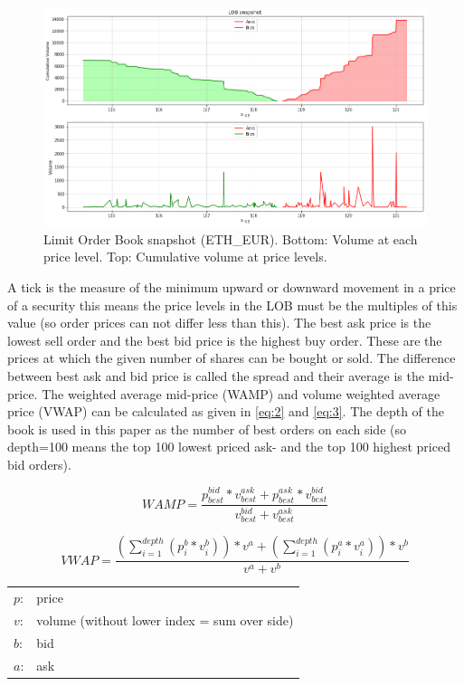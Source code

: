 \documentclass[11pt,a4paper,oneside]{article}
\begin{document}
  \begin{figure}[tbh]
    \centering
    \includegraphics[width=\textwidth]{lob_snapshot.png}
    \caption{Limit Order Book snapshot (ETH\_EUR). Bottom: Volume at each price level. Top: Cumulative volume at price levels.}
    \label{fig:1}
  \end{figure}

  A tick is the measure of the minimum upward or downward movement in a price of a security this means the price levels 
  in the LOB must be the multiples of this value (so order prices can not differ less than this). The best ask price is 
  the lowest sell order and the best bid price is the highest buy order. These are the prices at which the given number 
  of shares can be bought or sold. The difference between best ask and bid price is called the spread and their average 
  is the mid-price. The weighted average mid-price (WAMP) and volume weighted average price (VWAP) can be calculated as 
  given in \autoref{eq:2} and \autoref{eq:3}. The depth of the book is used in this paper as the number of best orders 
  on each side (so depth=100 means the top 100 lowest priced ask- and the top 100 highest priced bid orders).

  \begin{equation}
    WAMP = \frac{p_{best}^{bid} * v_{best}^{ask} + p_{best}^{ask} * v_{best}^{bid}}{v_{best}^{bid} + v_{best}^{ask}}
    \label{eq:2}
  \end{equation}

  \begin{equation}
    VWAP = \frac{(\sum_{i=1}^{depth} (p_i^b * v_i^b))*v^a + (\sum_{i=1}^{depth} (p_i^a * v_i^a))*v^b}{v^a + v^b}
    \label{eq:3}
  \end{equation}

  \begin{center}
    \begin{tabular}{l l}
      $p$: & price \\
      $v$: & volume (without lower index = sum over side) \\
      $b$: & bid \\
      $a$: & ask
    \end{tabular}
  \end{center}
\end{document}
